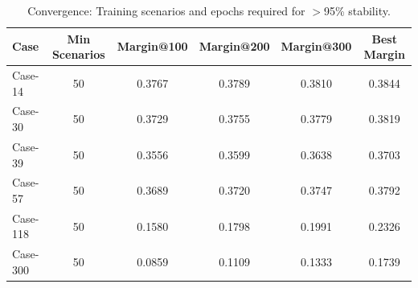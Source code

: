 \begin{table}[t]
\centering
\caption{Convergence: Training scenarios and epochs required for $>$95\% stability.}
\label{tab:convergence}
\begin{tabular}{lccccc}
\toprule
Case & Min Scenarios & Margin@100 & Margin@200 & Margin@300 & Best Margin \\
\midrule
Case-14 & 50 & 0.3767 & 0.3789 & 0.3810 & 0.3844 \\
Case-30 & 50 & 0.3729 & 0.3755 & 0.3779 & 0.3819 \\
Case-39 & 50 & 0.3556 & 0.3599 & 0.3638 & 0.3703 \\
Case-57 & 50 & 0.3689 & 0.3720 & 0.3747 & 0.3792 \\
Case-118 & 50 & 0.1580 & 0.1798 & 0.1991 & 0.2326 \\
Case-300 & 50 & 0.0859 & 0.1109 & 0.1333 & 0.1739 \\
\bottomrule
\end{tabular}
\end{table}